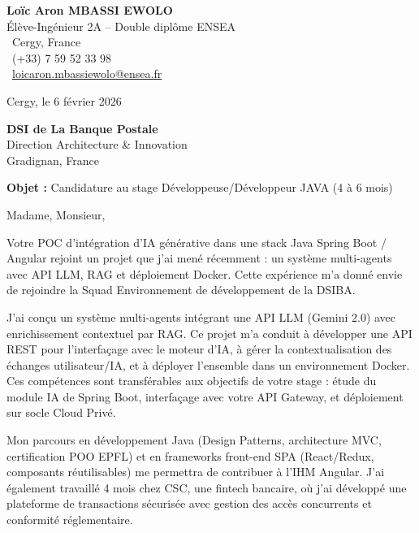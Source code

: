 \documentclass[a4paper,11pt]{article}
\begin{document}
\noindent
\begin{minipage}[t]{0.5\textwidth}
    \textbf{Loïc Aron MBASSI EWOLO}\\
    Élève-Ingénieur 2A -- Double diplôme ENSEA\\[3pt]
    \faMapMarker\ Cergy, France\\
    \faPhone\ (+33) 7 59 52 33 98\\
    \faEnvelope\ \href{mailto:loicaron.mbassiewolo@ensea.fr}{loicaron.mbassiewolo@ensea.fr}
\end{minipage}
\hfill
\begin{minipage}[t]{0.4\textwidth}
    \raggedleft
    Cergy, le 6 février 2026
\end{minipage}

\vspace{1.2cm}

\hfill
\begin{minipage}[t]{0.5\textwidth}
    \raggedleft
    \textbf{DSI de La Banque Postale}\\
    Direction Architecture \& Innovation\\
    Gradignan, France
\end{minipage}

\vspace{1cm}

\noindent\textbf{Objet :} Candidature au stage Développeuse/Développeur JAVA (4 à 6 mois)

\vspace{0.8cm}

Madame, Monsieur,

Votre POC d'intégration d'IA générative dans une stack Java Spring Boot / Angular rejoint un projet que j'ai mené récemment : un système multi-agents avec API LLM, RAG et déploiement Docker. Cette expérience m'a donné envie de rejoindre la Squad Environnement de développement de la DSIBA.

J'ai conçu un système multi-agents intégrant une API LLM (Gemini 2.0) avec enrichissement contextuel par RAG. Ce projet m'a conduit à développer une API REST pour l'interfaçage avec le moteur d'IA, à gérer la contextualisation des échanges utilisateur/IA, et à déployer l'ensemble dans un environnement Docker. Ces compétences sont transférables aux objectifs de votre stage : étude du module IA de Spring Boot, interfaçage avec votre API Gateway, et déploiement sur socle Cloud Privé.

Mon parcours en développement Java (Design Patterns, architecture MVC, certification POO EPFL) et en frameworks front-end SPA (React/Redux, composants réutilisables) me permettra de contribuer à l'IHM Angular. J'ai également travaillé 4 mois chez CSC, une fintech bancaire, où j'ai développé une plateforme de transactions sécurisée avec gestion des accès concurrents et conformité réglementaire.
\end{document}
